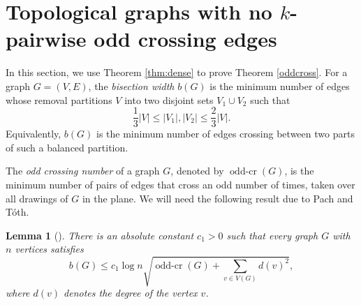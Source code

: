 \documentclass[11pt]{article}
\theoremstyle{plain}
\newtheorem{lemma}[theorem]{Lemma}
\theoremstyle{definition}
\theoremstyle{remark}
\begin{document}
\section{Topological graphs with no $k$-pairwise odd crossing edges}\label{sec:top}


In this section, we use Theorem \ref{thm:dense} to prove Theorem \ref{oddcross}.  For a graph \(G=(V,E)\), the \emph{bisection width} \(b(G)\) is the minimum number of edges whose removal partitions \(V\) into two disjoint sets \(V_1\cup V_2\) such that
\[
\frac{1}{3}|V|\le |V_1|,|V_2|\le \frac{2}{3}|V|.
\]
Equivalently, \(b(G)\) is the minimum number of edges crossing between two parts of such a balanced partition.



The \emph{odd crossing number} of a graph \(G\), denoted by \(\operatorname{odd\text{-}cr}(G)\), is the minimum number of pairs of edges that cross an odd number of times, taken over all drawings of \(G\) in the plane.  We will need the following result due to Pach and T\'oth.
 

\begin{lemma}[\cite{PTdisjoint}]\label{lem:mat}
There is an absolute constant \(c_1>0\) such that every graph \(G\) with \(n\) vertices satisfies
\[
b(G)\le c_1\log n \sqrt{\operatorname{odd\text{-}cr}(G)+\sum_{v\in V(G)}d(v)^2},
\]
where \(d(v)\) denotes the degree of the vertex \(v\).
\end{lemma}
\end{document}
